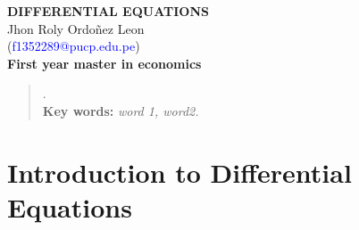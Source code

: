 \documentclass[11pt]{article}
\begin{document}
	\begin{titlepage}
		\vspace*{5cm}
		{\Large
			\begin{center}
				{\Huge \textbf{DIFFERENTIAL EQUATIONS}}
				\vspace{0.5cm}\\
				Jhon Roly Ordoñez Leon\\
				(\textcolor{blue}{f1352289@pucp.edu.pe})
				\vspace{0.5cm}\\
				\textbf{First year master in economics}
			\end{center}
		}
		\date{\today}
		\begin{abstract}
			\lipsum[1].\\
			\textbf{Key words:} \hspace{1mm} \textit{word 1, word2.}
		\end{abstract}
		\textcolor{red}{\tableofcontents}
	\end{titlepage}

	\section{Introduction to Differential Equations}
\end{document}
